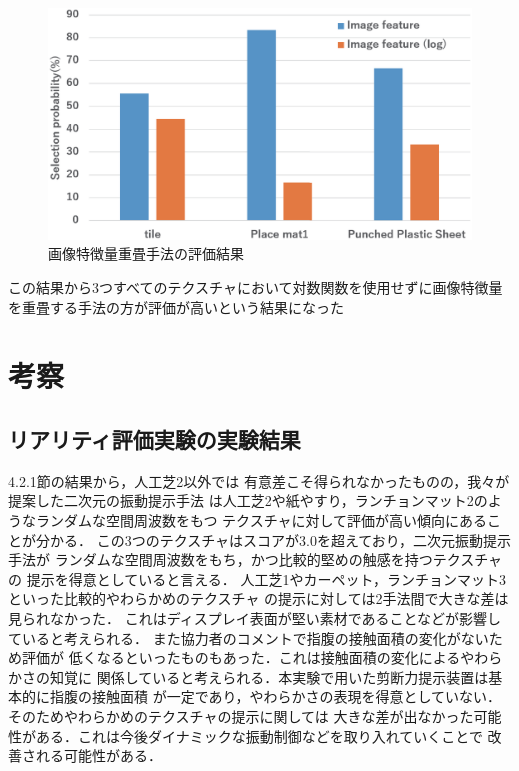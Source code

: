 \begin{figure}[h]
\begin{center}
  \includegraphics[width=15cm]{result2.eps}
  \caption{画像特徴量重畳手法の評価結果}
  \label{result2}
\end{center}
\end{figure}

この結果から3つすべてのテクスチャにおいて対数関数を使用せずに画像特徴量を重畳する手法の方が評価が高いという結果になった

\section{考察}
\subsection{リアリティ評価実験の実験結果}
4.2.1節の結果から，人工芝2以外では
有意差こそ得られなかったものの，我々が提案した二次元の振動提示手法
は人工芝2や紙やすり，ランチョンマット2のようなランダムな空間周波数をもつ
テクスチャに対して評価が高い傾向にあることが分かる．
この3つのテクスチャはスコアが3.0を超えており，二次元振動提示手法が
ランダムな空間周波数をもち，かつ比較的堅めの触感を持つテクスチャの
提示を得意としていると言える．
人工芝1やカーペット，ランチョンマット3といった比較的やわらかめのテクスチャ
の提示に対しては2手法間で大きな差は見られなかった．
これはディスプレイ表面が堅い素材であることなどが影響していると考えられる．
また協力者のコメントで指腹の接触面積の変化がないため評価が
低くなるといったものもあった．これは接触面積の変化によるやわらかさの知覚に
関係していると考えられる．本実験で用いた剪断力提示装置は基本的に指腹の接触面積
が一定であり，やわらかさの表現を得意としていない．そのためやわらかめのテクスチャの提示に関しては
大きな差が出なかった可能性がある．これは今後ダイナミックな振動制御などを取り入れていくことで
改善される可能性がある．  


